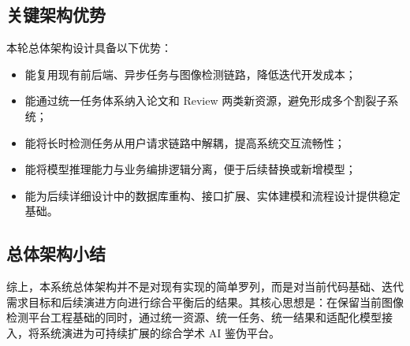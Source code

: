 \subsection{关键架构优势}
本轮总体架构设计具备以下优势：
\begin{itemize}[leftmargin=2em]
    \item 能复用现有前后端、异步任务与图像检测链路，降低迭代开发成本；
    \item 能通过统一任务体系纳入论文和 Review 两类新资源，避免形成多个割裂子系统；
    \item 能将长时检测任务从用户请求链路中解耦，提高系统交互流畅性；
    \item 能将模型推理能力与业务编排逻辑分离，便于后续替换或新增模型；
    \item 能为后续详细设计中的数据库重构、接口扩展、实体建模和流程设计提供稳定基础。
\end{itemize}

\subsection{总体架构小结}
综上，本系统总体架构并不是对现有实现的简单罗列，而是对当前代码基础、迭代需求目标和后续演进方向进行综合平衡后的结果。其核心思想是：在保留当前图像检测平台工程基础的同时，通过统一资源、统一任务、统一结果和适配化模型接入，将系统演进为可持续扩展的综合学术 AI 鉴伪平台。
